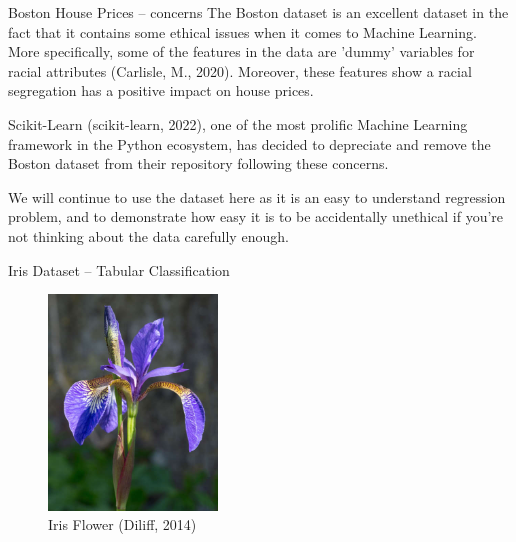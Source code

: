 \documentclass[10pt]{beamer}
\begin{document}
\begin{frame}[label={sec:org2806502}]{Boston House Prices -- concerns}
The Boston dataset is an excellent dataset in the fact that it contains some ethical
issues when it comes to Machine Learning. More specifically, some of the features in
the data are 'dummy' variables for racial attributes (Carlisle, M., 2020). Moreover, these features show a
racial segregation has a positive impact on house prices.

Scikit-Learn (scikit-learn, 2022), one of the most prolific Machine Learning framework in the Python
ecosystem, has decided to depreciate and remove the Boston dataset from their
repository following these concerns.

We will continue to use the dataset here as it is an easy to understand regression
problem, and to demonstrate how easy it is to be accidentally unethical if you're not
thinking about the data carefully enough. 
\end{frame}

\begin{frame}[label={sec:org2c60b06}]{Iris Dataset -- Tabular Classification}
\begin{figure}[htbp]
\centering
\includegraphics[width=0.4\textwidth]{images/iris.jpg}
\caption{Iris Flower (Diliff, 2014)}
\end{figure}
\end{frame}
\end{document}
